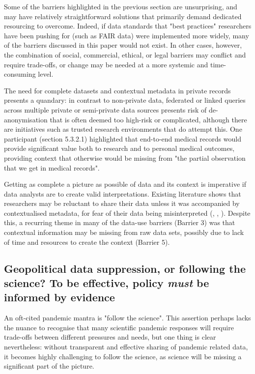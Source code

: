 \documentclass{CUP-JNL-DAP}%
\begin{document}
Some of the barriers highlighted in the previous section are unsurprising, and may have relatively straightforward solutions that primarily demand dedicated resourcing to overcome. Indeed, if data standards that "best practices" researchers have been pushing for (such as FAIR data) were implemented more widely, many of the barriers discussed in this paper would not exist. In other cases, however, the combination of social, commercial, ethical, or legal barriers may conflict and require trade-offs, or change may be needed at a more systemic and time-consuming level. 

The need for complete datasets and contextual metadata in private records presents a quandary: in contrast to non-private data, federated or linked queries across multiple private or semi-private data sources presents risk of de-anonymisation that is often deemed too high-risk or complicated, although there are initiatives such as trusted research environments that do attempt this. One participant (section 5.3.2.1) highlighted that end-to-end medical records would provide significant value both to research and to personal medical outcomes, providing context that otherwise would be missing from "the partial observation that we get in medical records".

Getting as complete a picture as possible of data and its context is imperative if data analysts are to create valid interpretations. Existing literature shows that researchers may be reluctant to share their data unless it was accompanied by contextualised metadata, for fear of their data being misinterpreted  (\cite{datasharing_rcts}, \cite{Yimei_Zhu_Open_access_in_uk}, \cite{empirical_datasharing_plos}). Despite this, a recurring theme in many of the data-use barriers (Barrier 3) was that contextual information may be missing from raw data sets, possibly due to lack of time and resources to create the context (Barrier 5). 

\subsection{Geopolitical data suppression, or following the science? To be effective, policy \textit{must} be informed by evidence}

An oft-cited pandemic mantra is "follow the science". This assertion perhaps lacks the nuance to recognise that many scientific pandemic responses will require trade-offs between different pressures and needs, but one thing is clear nevertheless: without transparent and effective sharing of pandemic related data, it becomes highly challenging to follow the science, as science will be missing a significant part of the picture. 
\end{document}
